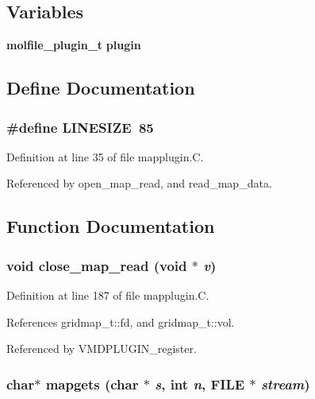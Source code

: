 \subsection*{Variables}
\begin{CompactItemize}
\item 
{\bf molfile\_\-plugin\_\-t} {\bf plugin}
\end{CompactItemize}


\subsection{Define Documentation}
\subsubsection{\setlength{\rightskip}{0pt plus 5cm}\#define LINESIZE\ 85}\label{mapplugin_8C_a0}




Definition at line 35 of file mapplugin.C.

Referenced by open\_\-map\_\-read, and read\_\-map\_\-data.

\subsection{Function Documentation}
\subsubsection{\setlength{\rightskip}{0pt plus 5cm}void close\_\-map\_\-read (void $\ast$ {\em v})\hspace{0.3cm}{\tt  [static]}}\label{mapplugin_8C_a6}




Definition at line 187 of file mapplugin.C.

References gridmap\_\-t::fd, and gridmap\_\-t::vol.

Referenced by VMDPLUGIN\_\-register.
\subsubsection{\setlength{\rightskip}{0pt plus 5cm}char$\ast$ mapgets (char $\ast$ {\em s}, int {\em n}, FILE $\ast$ {\em stream})\hspace{0.3cm}{\tt  [static]}}\label{mapplugin_8C_a2}




